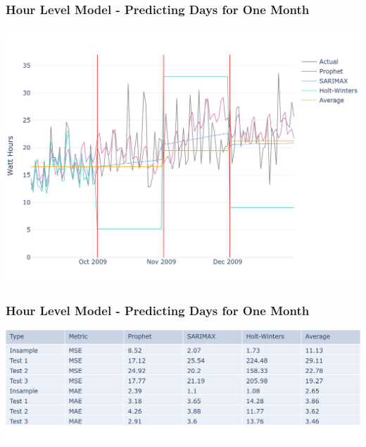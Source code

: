 \documentclass[10pt]{beamer}
\begin{document}
\begin{frame}
\frametitle{Hour Level Model - Predicting Days for One Month}

\bigskip
{
    \centering
    \includegraphics[width=\textwidth,height=\textheight,keepaspectratio]{model_comparison_timeseries_hourmodel_days.png}
    \par
}
\bigskip

\end{frame}


\begin{frame}
\frametitle{Hour Level Model - Predicting Days for One Month}

\bigskip
{
    \centering
    \includegraphics[width=\textwidth,height=\textheight,keepaspectratio]{model_comparison_table_hourmodel_days.png}
    \par
}
\bigskip

\end{frame}
\end{document}
